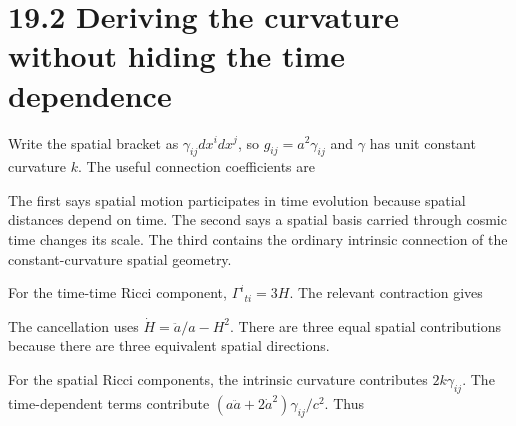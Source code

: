 \documentclass[
  11pt,
  letterpaper,
  oneside,
  openany]{scrbook}
\begin{document}
\hypertarget{deriving-the-curvature-without-hiding-the-time-dependence}{%
\section{19.2 Deriving the curvature without hiding the time
dependence}\label{deriving-the-curvature-without-hiding-the-time-dependence}}

Write the spatial bracket as \(\gamma_{ij}dx^i dx^j\), so
\(g_{ij}=a^2\gamma_{ij}\) and \(\gamma\) has unit constant curvature
\(k\). The useful connection coefficients are

\begin{center}
\begingroup
{}
\ifdim\wd\grmathbox>\linewidth
\resizebox{\linewidth}{!}{\usebox{\grmathbox}}
\else\usebox{\grmathbox}\fi
\endgroup
\end{center}

The first says spatial motion participates in time evolution because
spatial distances depend on time. The second says a spatial basis
carried through cosmic time changes its scale. The third contains the
ordinary intrinsic connection of the constant-curvature spatial
geometry.

For the time-time Ricci component, \(\Gamma^i{}_{ti}=3H\). The relevant
contraction gives

\begin{center}
\begingroup
{}
\ifdim\wd\grmathbox>\linewidth
\resizebox{\linewidth}{!}{\usebox{\grmathbox}}
\else\usebox{\grmathbox}\fi
\endgroup
\end{center}

The cancellation uses \(\dot H=\ddot a/a-H^2\). There are three equal
spatial contributions because there are three equivalent spatial
directions.

For the spatial Ricci components, the intrinsic curvature contributes
\(2k\gamma_{ij}\). The time-dependent terms contribute
\((a\ddot a+2\dot a^2)\gamma_{ij}/c^2\). Thus

\begin{center}
\begingroup
{}
\ifdim\wd\grmathbox>\linewidth
\resizebox{\linewidth}{!}{\usebox{\grmathbox}}
\else\usebox{\grmathbox}\fi
\endgroup
\end{center}
\end{document}
